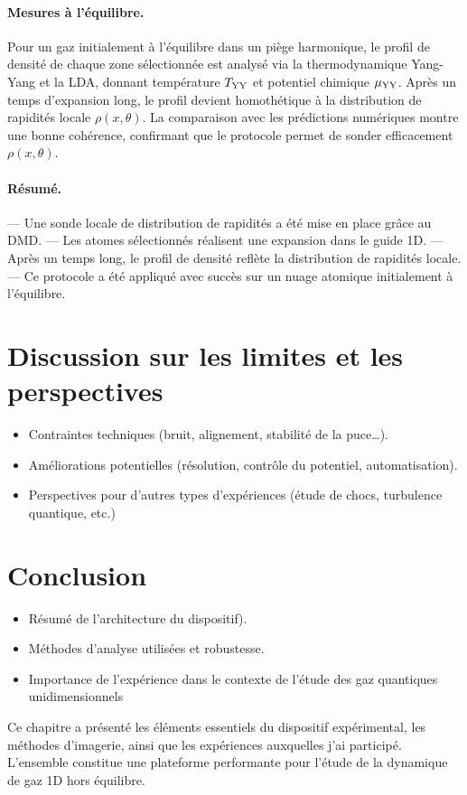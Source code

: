 \paragraph{Mesures à l’équilibre.}  
Pour un gaz initialement à l’équilibre dans un piège harmonique, le profil de densité de chaque zone sélectionnée est analysé via la thermodynamique Yang-Yang et la LDA, donnant température \(T_{\rm YY}\) et potentiel chimique \(\mu_{\rm YY}\). Après un temps d’expansion long, le profil devient homothétique à la distribution de rapidités locale \(\rho(x,\theta)\). La comparaison avec les prédictions numériques montre une bonne cohérence, confirmant que le protocole permet de sonder efficacement \(\rho(x,\theta)\).

\paragraph{Résumé.}  
— Une sonde locale de distribution de rapidités a été mise en place grâce au DMD.  
— Les atomes sélectionnés réalisent une expansion dans le guide 1D.  
— Après un temps long, le profil de densité reflète la distribution de rapidités locale.  
— Ce protocole a été appliqué avec succès sur un nuage atomique initialement à l’équilibre.


\section{Discussion sur les limites et les perspectives}
\begin{itemize}
    \item Contraintes techniques (bruit, alignement, stabilité de la puce…).
    \item Améliorations potentielles (résolution, contrôle du potentiel, automatisation).
    \item Perspectives pour d’autres types d’expériences (étude de chocs, turbulence quantique, etc.)
\end{itemize}

\section*{Conclusion}
\begin{itemize}
    \item Résumé de l’architecture du dispositif).
    \item Méthodes d’analyse utilisées et robustesse.
    \item Importance de l’expérience dans le contexte de l’étude des gaz quantiques unidimensionnels
\end{itemize}
Ce chapitre a présenté les éléments essentiels du dispositif expérimental, les méthodes d’imagerie, ainsi que les expériences auxquelles j’ai participé. L’ensemble constitue une plateforme performante pour l’étude de la dynamique de gaz 1D hors équilibre.


